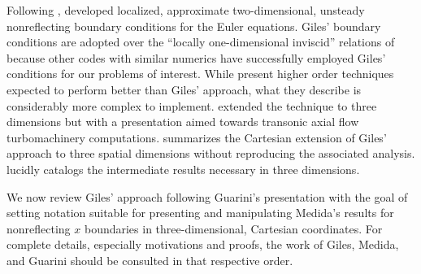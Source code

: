 Following \citet{Engquist1977Absorbing},
\citet{Giles1988Nonreflecting,Giles1990Nonreflecting} developed localized,
approximate two-dimensional, unsteady nonreflecting boundary conditions for the
Euler equations.  Giles' boundary conditions are adopted over the ``locally
one-dimensional inviscid'' relations of \citet{Poinsot1992Boundary} because
other codes with similar numerics have successfully employed Giles' conditions
for our problems of interest.  While \citet{Rowley2000Discretely} present
higher order techniques expected to perform better than Giles' approach, what
they describe is considerably more complex to implement.
\citet{Saxer1993QuasiThreeDimensional} extended the technique to three
dimensions but with a presentation aimed towards transonic axial flow
turbomachinery computations.  \citet{Guarini1998} summarizes the Cartesian
extension of Giles' approach to three spatial dimensions without reproducing
the associated analysis.  \citet{Medida2007} lucidly catalogs the intermediate
results necessary in three dimensions.

We now review Giles' approach following Guarini's presentation with the goal of
setting notation suitable for presenting and manipulating Medida's results for
nonreflecting $x$ boundaries in three-dimensional, Cartesian coordinates.  For
complete details, especially motivations and proofs, the work of Giles, Medida,
and Guarini should be consulted in that respective order.

